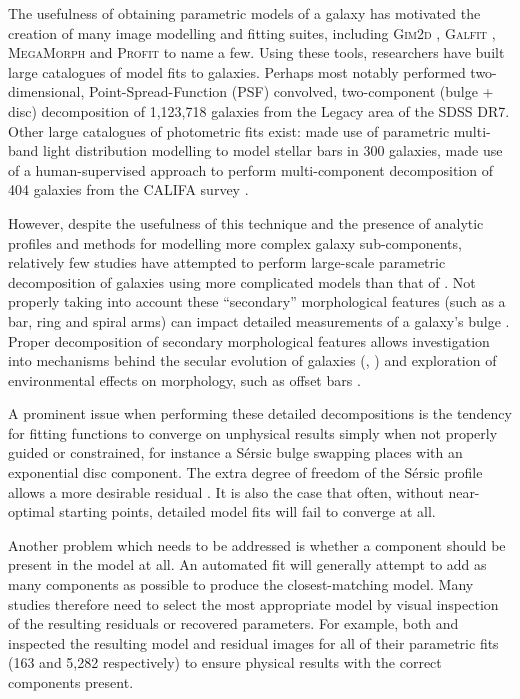 \documentclass[../main.tex]{subfiles}
\begin{document}
The usefulness of obtaining parametric models of a galaxy has motivated the creation of many image modelling and fitting suites, including \textsc{Gim2d} \citep{gim2d-paper}, \textsc{Galfit} \citep{galfit-paper}, \textsc{MegaMorph} \citep{megamorph-paper} and \textsc{Profit} \citep{profit-paper} to name a few. Using these tools, researchers have built large catalogues of model fits to galaxies. Perhaps most notably \citet{Simard2002:astro-ph/0205025v2} performed two-dimensional, Point-Spread-Function (PSF) convolved, two-component (bulge + disc) decomposition of 1,123,718 galaxies from the Legacy area of the SDSS DR7. Other large catalogues of photometric fits exist: \cite{Gadotti2010:1003.1719v2} made use of parametric multi-band light distribution modelling to model stellar bars in 300 galaxies, \cite{Mendez-Abreu2016:1610.05324v1} made use of a human-supervised approach to perform multi-component decomposition of 404 galaxies from the CALIFA survey \citep{Sanchez2011:1111.0962v2}.

However, despite the usefulness of this technique and the presence of analytic profiles and methods for modelling more complex galaxy sub-components, relatively few studies have attempted to perform large-scale parametric decomposition of galaxies using more complicated models than that of \citet{Simard2002:astro-ph/0205025v2}. Not properly taking into account these ``secondary'' morphological features (such as a bar, ring and spiral arms) can impact detailed measurements of a galaxy's bulge \citep{Gao2017:1709.00746v1}. Proper decomposition of secondary morphological features allows investigation into mechanisms behind the secular evolution of galaxies (\citealt{2018MNRAS.473.4731K}, \citealt{2018ApJ...862..100G}) and exploration of environmental effects on morphology, such as offset bars \citep{2017MNRAS.469.3363K}.

A prominent issue when performing these detailed decompositions is the tendency for fitting functions to converge on unphysical results simply when not properly guided or constrained, for instance a S\'ersic bulge swapping places with an exponential disc component. The extra degree of freedom of the S\'ersic profile allows a more desirable residual \citep{2017MNRAS.469.3363K}. It is also the case that often, without near-optimal starting points, detailed model fits will fail to converge at all.

Another problem which needs to be addressed is whether a component should be present in the model at all. An automated fit will generally attempt to add as many components as possible to produce the closest-matching model. Many studies therefore need to select the most appropriate model by visual inspection of the resulting residuals or recovered parameters. For example, both \citet{Vika2014:1408.4070v1} and \citet{2018MNRAS.473.4731K} inspected the resulting model and residual images for all of their parametric fits (163 and 5,282 respectively) to ensure physical results with the correct components present.
\end{document}

